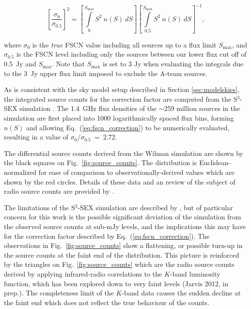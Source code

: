 \documentclass{aa}
\begin{document}
\begin{equation}
\left[\frac{\sigma_{0}}{\sigma_{0.5}}\right]^{2} = \left[\int\limits_{0}^{S_\mathrm{max}} S^{2}~n(S)~dS\right]  \left[\int\limits_{0.5}^{S_\mathrm{max}} S^{2}~n(S)~dS\right]^{-1},
\label{eq:fscn_correction}
\end{equation}

\noindent where $\sigma_{0}$ is the \emph{true} FSCN value including all sources up to a flux limit $S_\mathrm{max}$, and $\sigma_{0.5}$ is the FSCN level including only the sources between our lower flux cut off of 0.5~Jy and $S_\mathrm{max}$. Note that $S_\mathrm{max}$ is set to 3 Jy when evaluating the integrals due to the 3~Jy upper flux limit imposed to exclude the A-team sources. 

As is consistent with the sky model setup described in Section \ref{sec:modelskies}, the integrated source counts for the correction factor are computed from the S$^{3}$-SEX simulation \citep{Wilman-simulation}. The 1.4~GHz flux densities of the $\sim$259 million sources in the simulation are first placed into 1000 logarithmically spaced flux bins, forming $n(S)$ and allowing Eq.~(\ref{eq:fscn_correction}) to be numerically evaluated, resulting in a value of $\sigma_{0}$/$\sigma_{0.5}$~=~2.72.

The differential source counts derived from the Wilman simulation are shown by the black squares on Fig.~\ref{fig:source_counts}. The distribution is Euclidean-normalized for ease of comparison to observationally-derived values which are shown by the red circles. Details of these data and an review of the subject of radio source counts are provided by \citet{deZotti-surveys}. 

The limitations of the S$^{3}$-SEX simulation are described by \citet{Wilman-simulation}, but of particular concern for this work is the possible significant deviation of the simulation from the observed source counts at sub-mJy levels, and the implications this may have for the correction factor described by Eq.~(\ref{eq:fscn_correction}). The observations in Fig.~\ref{fig:source_counts} show a flattening, or possible turn-up in the source counts at the faint end of the distribution. This picture is reinforced by the triangles on Fig.~\ref{fig:source_counts} which are the radio source counts derived by applying infrared-radio correlations to the $K$-band luminosity function, which has been explored down to very faint levels (Jarvis 2012, in prep.). The completeness limit of the $K$-band data causes the sudden decline at the faint end which does not reflect the true behaviour of the counts.
\end{document}
